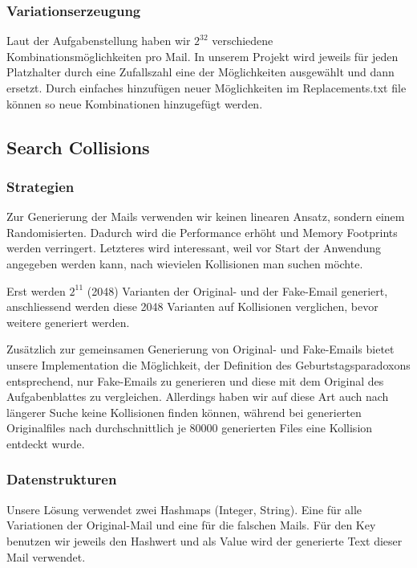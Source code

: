 \documentclass[12pt]{scrartcl}
\begin{document}
\subsubsection{Variationserzeugung}
Laut der Aufgabenstellung haben wir $2^{32}$ verschiedene Kombinationsmöglichkeiten pro Mail. In unserem Projekt wird jeweils für jeden Platzhalter durch eine Zufallszahl eine der Möglichkeiten ausgewählt und dann ersetzt. Durch einfaches hinzufügen neuer Möglichkeiten im Replacements.txt file können so neue Kombinationen hinzugefügt werden.

\subsection{Search Collisions}
\subsubsection{Strategien}
Zur Generierung der Mails verwenden wir keinen linearen Ansatz, sondern einem Randomisierten. Dadurch wird die Performance erhöht und Memory Footprints werden verringert. Letzteres wird interessant, weil vor Start der Anwendung angegeben werden kann, nach wievielen Kollisionen man suchen möchte.

Erst werden $2^{11}$ (2048) Varianten der Original- und der Fake-Email generiert, anschliessend werden diese 2048 Varianten auf Kollisionen verglichen, bevor weitere generiert werden.

Zusätzlich zur gemeinsamen Generierung von Original- und Fake-Emails bietet unsere Implementation die Möglichkeit, der Definition des Geburtstagsparadoxons entsprechend, nur Fake-Emails zu generieren und diese mit dem Original des Aufgabenblattes zu vergleichen. Allerdings haben wir auf diese Art auch nach längerer Suche keine Kollisionen finden können, während bei generierten Originalfiles nach durchschnittlich je 80000 generierten Files eine Kollision entdeckt wurde.

\subsubsection{Datenstrukturen}
Unsere Lösung verwendet zwei Hashmaps (Integer, String). Eine für alle Variationen der Original-Mail und eine für die falschen Mails. Für den Key benutzen wir jeweils den Hashwert und als Value wird der generierte Text dieser Mail verwendet.
 
\end{document}
